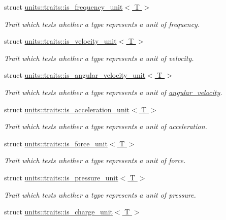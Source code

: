 \begin{DoxyCompactItemize}
struct \hyperlink{structunits_1_1traits_1_1is__frequency__unit}{units\+::traits\+::is\+\_\+frequency\+\_\+unit$<$ T $>$}
\begin{DoxyCompactList}\small\item\em Trait which tests whether a type represents a unit of frequency. \end{DoxyCompactList}\item 
struct \hyperlink{structunits_1_1traits_1_1is__velocity__unit}{units\+::traits\+::is\+\_\+velocity\+\_\+unit$<$ T $>$}
\begin{DoxyCompactList}\small\item\em Trait which tests whether a type represents a unit of velocity. \end{DoxyCompactList}\item 
struct \hyperlink{structunits_1_1traits_1_1is__angular__velocity__unit}{units\+::traits\+::is\+\_\+angular\+\_\+velocity\+\_\+unit$<$ T $>$}
\begin{DoxyCompactList}\small\item\em Trait which tests whether a type represents a unit of \hyperlink{namespaceunits_1_1angular__velocity}{angular\+\_\+velocity}. \end{DoxyCompactList}\item 
struct \hyperlink{structunits_1_1traits_1_1is__acceleration__unit}{units\+::traits\+::is\+\_\+acceleration\+\_\+unit$<$ T $>$}
\begin{DoxyCompactList}\small\item\em Trait which tests whether a type represents a unit of acceleration. \end{DoxyCompactList}\item 
struct \hyperlink{structunits_1_1traits_1_1is__force__unit}{units\+::traits\+::is\+\_\+force\+\_\+unit$<$ T $>$}
\begin{DoxyCompactList}\small\item\em Trait which tests whether a type represents a unit of force. \end{DoxyCompactList}\item 
struct \hyperlink{structunits_1_1traits_1_1is__pressure__unit}{units\+::traits\+::is\+\_\+pressure\+\_\+unit$<$ T $>$}
\begin{DoxyCompactList}\small\item\em Trait which tests whether a type represents a unit of pressure. \end{DoxyCompactList}\item 
struct \hyperlink{structunits_1_1traits_1_1is__charge__unit}{units\+::traits\+::is\+\_\+charge\+\_\+unit$<$ T $>$}

\end{DoxyCompactItemize}
